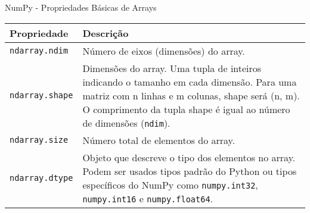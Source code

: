 \begin{frame}{NumPy - Propriedades Básicas de Arrays}

    \centering
    \begin{tabular}{|l|p{8cm}|}
        \hline
        \textbf{Propriedade}   & \textbf{Descrição}                                                                                                                                                                                                        \\
        \hline
        \texttt{ndarray.ndim}  & Número de eixos (dimensões) do array.                                                                                                                                                                                     \\
        \hline
        \texttt{ndarray.shape} & Dimensões do array. Uma tupla de inteiros indicando o tamanho em cada dimensão. Para uma matriz com n linhas e m colunas, shape será (n, m). O comprimento da tupla shape é igual ao número de dimensões (\texttt{ndim}). \\
        \hline
        \texttt{ndarray.size}  & Número total de elementos do array.                                                                                                                                                                                       \\
        \hline
        \texttt{ndarray.dtype} & Objeto que descreve o tipo dos elementos no array. Podem ser usados tipos padrão do Python ou tipos específicos do NumPy como \texttt{numpy.int32}, \texttt{numpy.int16} e \texttt{numpy.float64}.                        \\
        \hline
    \end{tabular}






\end{frame}


